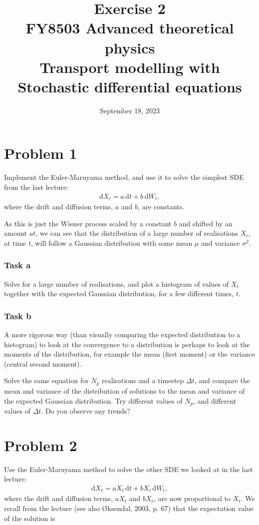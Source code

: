\documentclass[a4paper]{article}
\title{\vspace{-3em} Exercise 2\\[10pt] \large FY8503 Advanced theoretical physics\\  Transport modelling with Stochastic differential equations}
\author{September 18, 2023}
\date{}
\begin{document}
\maketitle

\section*{Problem 1}

Implement the Euler-Maruyama method, and use it to solve the simplest SDE from the last lecture:
\begin{align}
    \label{eq:}
    \mathrm{d} X_t = a \, \mathrm{d}t + b \, \mathrm{d}W_t,
\end{align}
where the drift and diffusion terms, $a$ and $b$, are constants.

As this is just the Wiener process scaled by a constant $b$ and shifted by an amount $at$, we can see that the distribution of a large number of realisations $X_t$, at time $t$, will follow a Gaussian distribution with some mean $\mu$ and variance $\sigma^2$.

\subsubsection*{Task a}
Solve for a large number of realisations, and plot a histogram of values of $X_t$ together with the expected Gaussian distribution, for a few different times, $t$.

\subsubsection*{Task b}
A more rigorous way (than visually comparing the expected distribution to a histogram) to look at the convergence to a distribution is perhaps to look at the moments of the distribution, for example the mean (first moment) or the variance (central second moment).

Solve the same equation for $N_p$ realisations and a timestep $\Delta t$, and compare the mean and variance of the distribution of solutions to the mean and variance of the expected Gaussian distribution. Try different values of $N_p$, and different values of $\Delta t$. Do you observe any trends?

\section*{Problem 2}

Use the Euler-Maruyama method to solve the other SDE we looked at in the last lecture:
\begin{align}
    \label{eq:}
    \mathrm{d} X_t = a X_t \, \mathrm{d}t + b X_t \, \mathrm{d}W_t,
\end{align}
where the drift and diffusion terms, $a X_t$ and $b X_t$, are now proportional to $X_t$. We recall from the lecture (see also Øksendal, 2003, p. 67) that the expectation value of the solution is 
\end{document}
